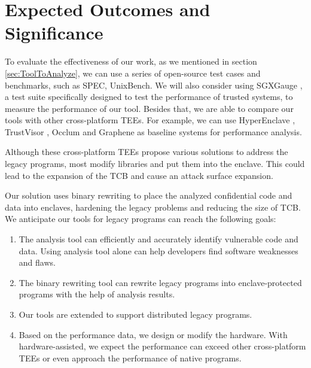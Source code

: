 \section{Expected Outcomes and Significance}
To evaluate the effectiveness of our work, as we mentioned in section
\ref{sec:ToolToAnalyze}, we can use a series of open-source test cases and benchmarks,
such as SPEC, UnixBench. 
We will also consider using SGXGauge \cite{Kumar2022ACB}, a test suite specifically
designed to test the performance of trusted systems, to measure the performance
of our tool.
Besides that, we are able to compare our tools with other cross-platform TEEs.
For example, we can use HyperEnclave \cite{Jia2022HyperEnclaveAO}, TrustVisor
\cite{McCune2010TrustVisorET}, Occlum \cite{Shen2020OcclumSA} and Graphene
\cite{Tsai2017GrapheneSGXAP} as baseline systems for performance analysis.

Although these cross-platform TEEs propose various solutions to address the
legacy programs, most modify libraries and put them into the enclave.
This could lead to the expansion of the TCB and cause  an attack surface expansion.

Our solution uses binary rewriting to place the analyzed confidential code and data
into enclaves, hardening the legacy problems and reducing the size of TCB.
We anticipate our tools for legacy programs can reach the following goals:
\begin{enumerate}
    \item The analysis tool can efficiently and accurately identify vulnerable code and data.
    Using analysis tool alone can help developers find software weaknesses and flaws.
    \item The binary rewriting tool can rewrite legacy programs into enclave-protected programs
    with the help of analysis results.
    \item Our tools are extended to support distributed legacy programs.
    \item Based on the performance data, we design or modify the hardware.
    With hardware-assisted, we expect the performance can exceed other cross-platform TEEs
    or even approach the performance of native programs.
\end{enumerate}